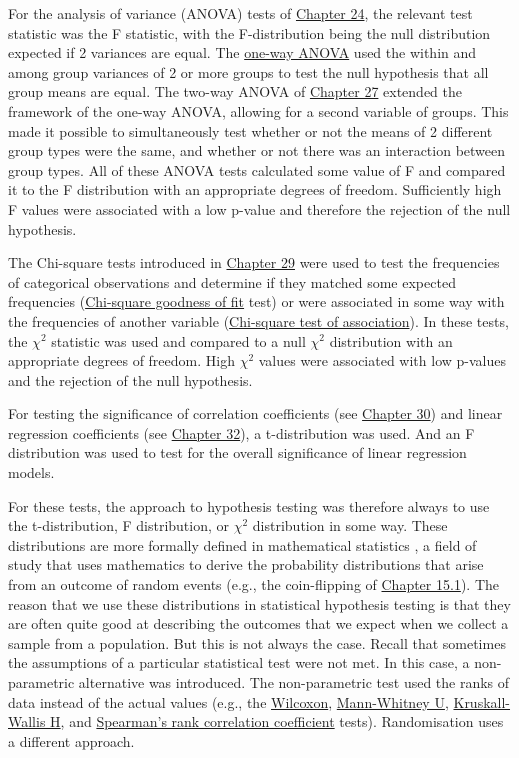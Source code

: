 \documentclass[
  openany]{krantz}
\begin{document}
For the analysis of variance (ANOVA) tests of \protect\hyperlink{Chapter_24}{Chapter 24}, the relevant test statistic was the F statistic, with the F-distribution being the null distribution expected if 2 variances are equal.
The \protect\hyperlink{one-way-anova}{one-way ANOVA} used the within and among group variances of 2 or more groups to test the null hypothesis that all group means are equal.
The two-way ANOVA of \protect\hyperlink{Chapter_27}{Chapter 27} extended the framework of the one-way ANOVA, allowing for a second variable of groups.
This made it possible to simultaneously test whether or not the means of 2 different group types were the same, and whether or not there was an interaction between group types.
All of these ANOVA tests calculated some value of F and compared it to the F distribution with an appropriate degrees of freedom.
Sufficiently high F values were associated with a low p-value and therefore the rejection of the null hypothesis.

The Chi-square tests introduced in \protect\hyperlink{Chapter_29}{Chapter 29} were used to test the frequencies of categorical observations and determine if they matched some expected frequencies (\protect\hyperlink{chi-squared-goodness-of-fit}{Chi-square goodness of fit} test) or were associated in some way with the frequencies of another variable (\protect\hyperlink{chi-squared-test-of-association}{Chi-square test of association}).
In these tests, the \(\chi^{2}\) statistic was used and compared to a null \(\chi^{2}\) distribution with an appropriate degrees of freedom.
High \(\chi^{2}\) values were associated with low p-values and the rejection of the null hypothesis.

For testing the significance of correlation coefficients (see \protect\hyperlink{Chapter_30}{Chapter 30}) and linear regression coefficients (see \protect\hyperlink{Chapter_32}{Chapter 32}), a t-distribution was used.
And an F distribution was used to test for the overall significance of linear regression models.

For these tests, the approach to hypothesis testing was therefore always to use the t-distribution, F distribution, or \(\chi^{2}\) distribution in some way.
These distributions are more formally defined in mathematical statistics \citep{Miller2004}, a field of study that uses mathematics to derive the probability distributions that arise from an outcome of random events (e.g., the coin-flipping of \protect\hyperlink{an-instructive-example}{Chapter 15.1}).
The reason that we use these distributions in statistical hypothesis testing is that they are often quite good at describing the outcomes that we expect when we collect a sample from a population.
But this is not always the case.
Recall that sometimes the assumptions of a particular statistical test were not met.
In this case, a non-parametric alternative was introduced.
The non-parametric test used the ranks of data instead of the actual values (e.g., the \protect\hyperlink{wilcoxon-test}{Wilcoxon}, \protect\hyperlink{mann-whitney-u-test}{Mann-Whitney U}, \protect\hyperlink{Chapter_26}{Kruskall-Wallis H}, and \protect\hyperlink{spearman-rank-correlation-coefficient}{Spearman's rank correlation coefficient} tests).
Randomisation uses a different approach.
\end{document}
